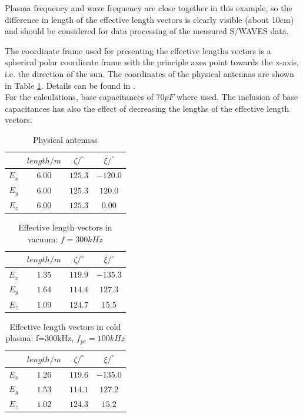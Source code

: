 \documentclass[two-coloumn,ras]{agutex}
\begin{document}
\begin{article}
Plasma frequency and wave frequency are close together in this example, so the difference in length of the effective length vectors is clearly visible (about 10cm) and should be considered for data processing of the measured S/WAVES data.

The coordinate frame used for presenting the effective lengths vectors is a spherical polar coordinate frame with the principle axes point towards the x-axis, i.e. the direction of the sun. The coordinates of the physical antennas are shown in Table \ref{tab:phys_ant}. Details can be found in \cite{ossi09}. \\

For the calculations, base capacitances of $70pF$ where used. The inclusion of base capacitances has also the effect of decreasing the lengths of the effective length vectors.\\
\begin{table}
\caption{Physical antennas}
\label{tab:phys_ant}
\begin{tabular}{|c|c|c|c|}
 \hline
 & $length/m$ & $\zeta/^\circ$ & $\xi/^\circ$ \\
\hline
$E_x$ & $6.00$ & $125.3$ & $-120.0$ \\
$E_y$ & $6.00$ & $125.3$ & $120.0$ \\
$E_z$ & $6.00$ & $125.3$ & $0.00$ \\
\hline\end{tabular}
\end{table}

\begin{table}
\caption{Effective length vectors in vacuum: $f=300kHz$}
\label{tab:heff_vacuum_stereo}
\begin{tabular}{|c|c|c|c|}
 \hline
 & $length/m$ & $\zeta/^\circ$ & $\xi/^\circ$ \\
\hline
$E_x$ & $1.35$ & $119.9$ & $-135.3$ \\
$E_y$ & $1.64$ & $114.4$ & $127.3$ \\
$E_z$ & $1.09$ & $124.7$ & $15.5$ \\
\hline\end{tabular}
\end{table}



\begin{table}
\caption{Effective length vectors in cold plasma: f=300kHz, $f_{pe}=100kHz$}
\label{tab:heff_cold_plasma_stereo}
\begin{tabular}{|c|c|c|c|}
 \hline
 & $length/m$ & $\zeta/^\circ$ & $\xi/^\circ$ \\
\hline
$E_x$ & $1.26$ & $119.6$ & $-135.0$ \\
$E_y$ & $1.53$ & $114.1$ & $127.2$ \\
$E_z$ & $1.02$ & $124.3$ & $15.2$ \\
\hline\end{tabular}
\end{table}




\end{article}
\end{document}
